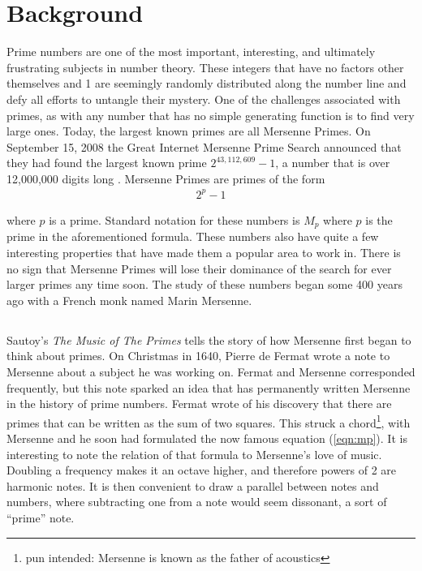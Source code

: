\section{Background}

Prime numbers are one of the most important, interesting, and ultimately frustrating subjects in number theory. These integers that have no factors other themselves and 1 are seemingly randomly distributed along the number line and defy all efforts to untangle their mystery. One of the challenges associated with primes, as with any number that has no simple generating function is to find very large ones.  Today, the largest known primes are all Mersenne Primes.  On September 15, 2008 the Great Internet Mersenne Prime Search announced that they had found the largest known prime $2^{43,112,609}-1$, a number that is over 12,000,000 digits long \cite{gimps}.  Mersenne Primes are primes of the form 
\begin{align}
2^p - 1
\label{eqn:mp}
\end{align}

where $p$ is a prime.  Standard notation for these numbers is $M_p$ where $p$ is the prime in the aforementioned formula.   These numbers also have quite a few interesting properties that have made them a popular area to work in. There is no sign that Mersenne Primes will lose their dominance of the search for ever larger primes any time soon.  The study of these numbers began some 400 years ago with a French monk named Marin Mersenne. 

\subsection{}

Sautoy's \textit{The Music of The Primes} \cite{sautoy} tells the story of how Mersenne first began to think about primes. On Christmas in 1640, Pierre de Fermat wrote a note to Mersenne about a subject he was working on. Fermat and Mersenne corresponded frequently, but this note sparked an idea that has permanently written Mersenne in the history of prime numbers. Fermat wrote of his discovery that there are primes that can be written as the sum of two squares.  This struck a chord\footnote{pun intended: Mersenne is known as the father of acoustics}, with Mersenne and he soon had formulated the now famous equation (\ref{eqn:mp}).  It is interesting to note the relation of that formula to Mersenne's love of music.  Doubling a frequency makes it an octave higher, and therefore powers of 2 are harmonic notes.  It is then convenient to draw a parallel between notes and numbers, where subtracting one from  a note would seem dissonant, a sort of ``prime'' note. 

